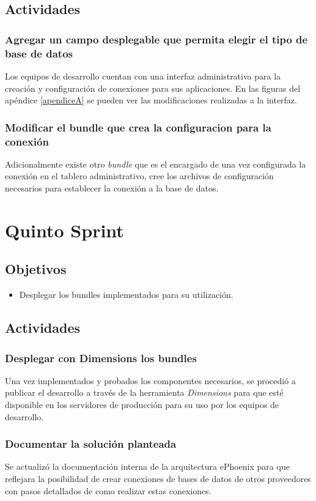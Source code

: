 \subsection{Actividades}
\subsubsection{Agregar un campo desplegable que permita elegir el tipo de base de datos}
Los equipos de desarrollo cuentan con una interfaz administrativa para la creación y configuración
de conexiones para sus aplicaciones. En las figuras del apéndice \ref{apendiceA} se pueden ver las
modificaciones realizadas a la interfaz.
\subsubsection{Modificar el bundle que crea la configuracion para la conexión}
Adicionalmente existe otro \emph{bundle} que es el encargado de una vez configurada la conexión
en el tablero administrativo, cree los archivos de configuración necesarios para establecer
la conexión a la base de datos.

\section{Quinto Sprint}

\subsection{Objetivos}
\begin{itemize}
  \item Desplegar los bundles implementados para su utilización.
\end{itemize}
\subsection{Actividades}
\subsubsection{Desplegar con Dimensions los bundles}
Una vez implementados y probados los componentes necesarios, se procedió a publicar
el desarrollo a través de la herramienta \emph{Dimensions} para que esté disponible
en los servidores de producción para su uso por los equipos de desarrollo.
\subsubsection{Documentar la solución planteada}
Se actualizó la documentación interna de la arquitectura ePhoenix para que reflejara
la posibilidad de crear conexiones de bases de datos de otros proveedores con pasos
detallados de como realizar estas conexiones.

